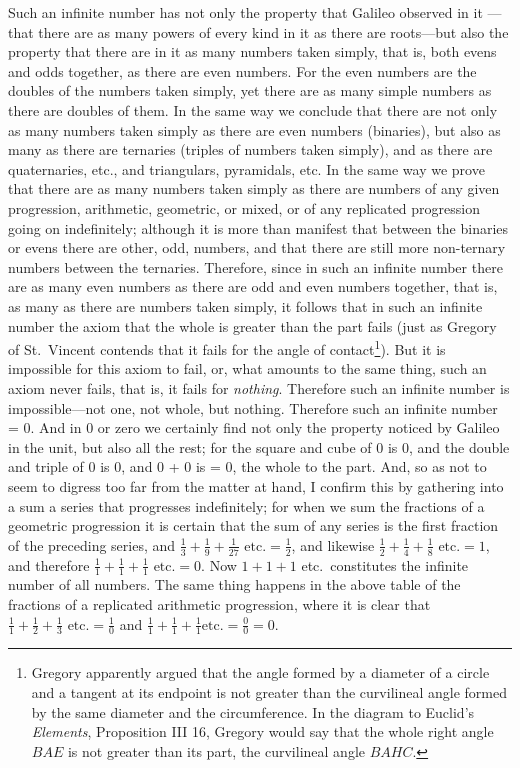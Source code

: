 \documentclass[polutonikogreek,english,twoside,openright]{article}
\begin{document}
Such an infinite number has not only the property that Galileo observed in it
---that there are as many powers of every kind in it as there are roots---but also the property that there are in it as many numbers taken simply, that
is, both evens and odds together, as there are even numbers. For the even
numbers are the doubles of the numbers taken simply, yet there are as many
simple numbers as there are doubles of them.  In the same way we conclude that
there are not only as many numbers taken simply as there are even numbers
(binaries), but also as many as there are ternaries (triples of numbers taken
simply), and as there are quaternaries, etc., and triangulars, pyramidals,
etc. In the same way we prove that there are as many numbers taken simply as
there are numbers of any given progression, arithmetic, geometric, or mixed,
or of any replicated progression going on indefinitely; although it is more
than manifest that between the binaries or evens there are other, odd,
numbers, and that there are still more non-ternary numbers between the
ternaries.  Therefore, since in such an infinite number there are as many even
numbers as there are odd and even numbers together, that is, as many as there
are numbers taken simply, it follows that in such an infinite number the axiom
that the whole is greater than the part fails (just as Gregory of St.\ Vincent
contends that it fails for the angle of contact\footnote{Gregory apparently argued that the angle formed by a diameter of a circle and a tangent at its endpoint is not greater than the curvilineal angle formed by the same diameter and the circumference.  In the diagram to Euclid's {\em Elements}, Proposition III 16, Gregory would say that the whole right angle $BAE$ is not greater than its part, the curvilineal angle $BAHC$.}).  But it is impossible for
this axiom to fail, or, what amounts to the same thing, such an axiom never
fails, that is, it fails for {\em nothing}.  Therefore such an infinite number
is impossible---not one, not whole, but nothing.  Therefore such an infinite
number = 0.  And in 0 or zero we certainly find not only the property noticed
by Galileo in the unit, but also all the rest; for the square and cube of 0 is
0, and the double and triple of 0 is 0, and 0 + 0 is = 0, the whole to the
part.  And, so as not to seem to digress too far from the matter at hand, I
confirm this by gathering into a sum a series that progresses indefinitely;
for when we sum the fractions of a geometric progression it is certain that
the sum of any series is the first fraction of the preceding series, and
$\frac{1}{3} + \frac{1}{9} +\frac{1}{27} \mbox{ etc.} = \frac{1}{2}$, and
likewise $\frac{1}{2} + \frac{1}{4} +\frac{1}{8} \mbox{ etc.} = 1$, and
therefore $\frac{1}{1} + \frac{1}{1} +\frac{1}{1} \mbox{ etc.} = 0$.  Now $1 +
1 + 1$ etc.\ constitutes the infinite number of all numbers.  The same thing
happens in the above table of the fractions of a replicated arithmetic
progression, where it is clear that $\frac{1}{1} + \frac{1}{2} +\frac{1}{3}
\mbox{ etc.} = \frac{1}{0}$ and $\frac{1}{1} + \frac{1}{1} +\frac{1}{1} \mbox{
etc.} = \frac{0}{0} = 0$.
\end{document}
